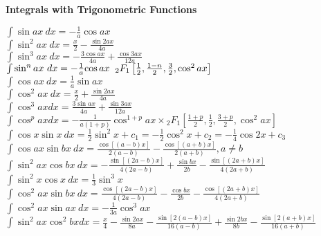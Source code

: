 \documentclass[10pt,landscape,a4paper]{article}
\begin{document}
\begin{multicols*}{3}
\textbf{Integrals with Trigonometric Functions}

$
\int \sin ax \ dx = -\frac{1}{a} \cos ax 
$\\

$
\int \sin^2 ax\  dx = \frac{x}{2} - \frac{\sin 2ax} {4a} 
$\\

$
\int \sin^3 ax \ dx = -\frac{3 \cos ax}{4a} + \frac{\cos 3ax} {12a} 
$\\

$
\int \sin^n ax \ dx =
 -\frac{1}{a}{\cos ax} \hspace{2mm}{_2F_1}\left[
\frac{1}{2}, \frac{1-n}{2}, \frac{3}{2}, \cos^2 ax
\right] 
$\\



$
\int \cos ax\ dx= \frac{1}{a} \sin ax 
$\\

$
\int \cos^2 ax\ dx = \frac{x}{2}+\frac{ \sin 2ax}{4a} 
$\\

$
\int \cos^3 ax dx = \frac{3 \sin ax}{4a}+\frac{ \sin 3ax}{12a} 
$\\

$
\int \cos^p ax dx  = -\frac{1}{a(1+p)}{\cos^{1+p} ax} \times 
{_2F_1}\left[
\frac{1+p}{2}, \frac{1}{2}, \frac{3+p}{2}, \cos^2 ax
\right] 
$\\

$\label{eq:veky}
\int \cos x \sin x\ dx = \frac{1}{2}\sin^2 x + c_1 = -\frac{1}{2} \cos^2x + c_2 = -\frac{1}{4} \cos 2x + c_3
$\\

$
\int \cos ax \sin bx\ dx = \frac{\cos[(a-b) x]}{2(a-b)} -
 \frac{\cos[(a+b)x]}{2(a+b)} , a\ne b
$\\

$
\int \sin^2 ax \cos bx\ dx = 
-\frac{\sin[(2a-b)x]}{4(2a-b)} 
+ \frac{\sin bx}{2b} 
- \frac{\sin[(2a+b)x]}{4(2a+b)}
$\\

$
\int \sin^2 x \cos x\ dx = \frac{1}{3} \sin^3 x
$\\

$
\int \cos^2 ax \sin bx\ dx = \frac{\cos[(2a-b)x]}{4(2a-b)} 
- \frac{\cos bx}{2b}
 - \frac{\cos[(2a+b)x]}{4(2a+b)}
$\\

$
\int \cos^2 ax \sin ax\ dx = -\frac{1}{3a}\cos^3{ax} 
$\\

$
\int \sin^2 ax \cos^2 bx dx = \frac{x}{4}
-\frac{\sin 2ax}{8a}-
\frac{\sin[2(a-b)x]}{16(a-b)}
+\frac{\sin 2bx}{8b}-
\frac{\sin[2(a+b)x]}{16(a+b)}
$\\


\end{multicols*}
\end{document}
